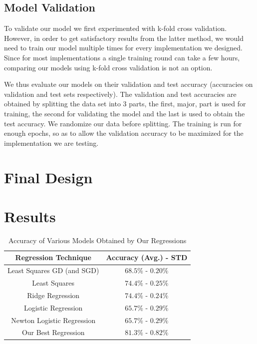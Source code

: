 \documentclass[10pt,conference,compsocconf]{IEEEtran}
\begin{document}
\subsection{Model Validation} 
\label{ssec:model_validation}

To validate our model we first experimented with k-fold cross validation. However, in order to get satisfactory results from the latter method, we would need to train our model multiple times for every implementation we designed. Since for most implementations a single training round can take a few hours, comparing our models using k-fold cross validation is not an option.

We thus evaluate our models on their validation and test accuracy (accuracies on validation and test sets respectively). The validation and test accuracies are obtained by splitting the data set into 3 parts, the first, major, part is used for training, the second for validating the model and the last is used to obtain the test accuracy. We randomize our data before splitting. The training is run for enough epochs, so as to allow the validation accuracy to be maximized for the implementation we are testing.

\section{Final Design}
\label{sec:final}


\section{Results}
\label{sec:results}



\begin{table}[h]
	\begin{tabular}{ |c|c| } 
		\hline
		\textbf{Regression Technique} & \textbf{Accuracy (Avg.) - STD}  \\
		\hline
		Least Squares GD (and SGD) & $68.5\%$ - $0.20\%$ \\ 
		Least Squares & $74.4\%$ - $0.25\%$ \\ 
		Ridge Regression & $74.4\%$ - $0.24\%$ \\ 
		Logistic Regression & $65.7\%$ - $0.29\%$ \\ 
		Newton Logistic Regression & $65.7\%$ - $0.29\%$ \\ 
		Our Best Regression & $81.3\%$ - $0.82\%$ \\ 
		\hline
	\end{tabular}
	\captionsetup{aboveskip=0.3cm,justification=centering, margin=0.1cm, labelfont=footnotesize, textfont=footnotesize}
	\caption{Accuracy of Various Models Obtained by Our Regressions}
	\label{tab:model_accuracy}
\end{table}
\end{document}
